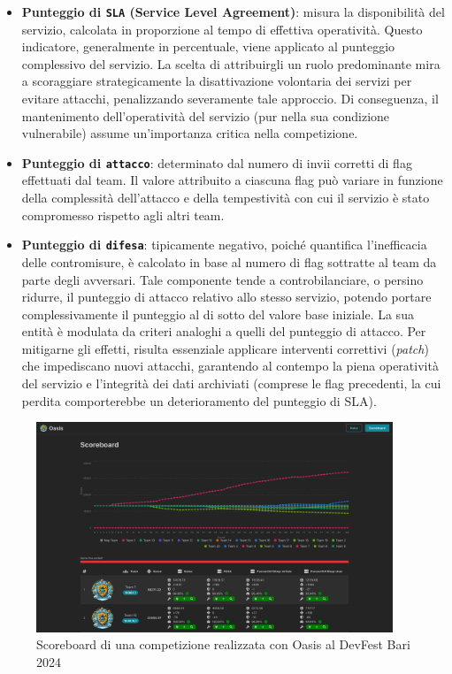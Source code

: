 \begin{itemize}
    \setlength{\itemsep}{2pt}
    \setlength{\parskip}{2pt}
    \item \textbf{Punteggio di \texttt{SLA} (Service Level Agreement)}: misura la disponibilità del servizio, calcolata in proporzione al tempo di effettiva operatività.
    Questo indicatore, generalmente in percentuale, viene applicato al punteggio complessivo del servizio.
    La scelta di attribuirgli un ruolo predominante mira a scoraggiare strategicamente la disattivazione volontaria dei servizi per evitare attacchi, penalizzando severamente tale approccio.
    Di conseguenza, il mantenimento dell’operatività del servizio (pur nella sua condizione vulnerabile) assume un’importanza critica nella competizione.
    \item \textbf{Punteggio di \texttt{attacco}}: determinato dal numero di invii corretti di flag effettuati dal team.
    Il valore attribuito a ciascuna flag può variare in funzione della complessità dell’attacco e della tempestività con cui il servizio è stato compromesso rispetto
    agli altri team.
    \item \textbf{Punteggio di \texttt{difesa}}: tipicamente negativo, poiché quantifica l’inefficacia delle contromisure, è calcolato in base al numero di flag sottratte al
    team da parte degli avversari. Tale componente tende a controbilanciare, o persino ridurre, il punteggio di attacco relativo allo stesso servizio,
    potendo portare complessivamente il punteggio al di sotto del valore base iniziale. La sua entità è modulata da criteri analoghi a quelli del punteggio di attacco.
    Per mitigarne gli effetti, risulta essenziale applicare interventi correttivi (\emph{patch}) che impediscano nuovi attacchi,
    garantendo al contempo la piena operatività del servizio e l’integrità dei dati archiviati (comprese le flag precedenti, la cui perdita comporterebbe un deterioramento del punteggio di SLA).
\end{itemize}

\begin{figure}[H]
    \centering
    \includegraphics[width=0.95\textwidth]{images/chapter1/oasis_scoreboard.png}
    \caption{Scoreboard di una competizione realizzata con Oasis al DevFest Bari 2024}\label{fig:oasis_scoreboard}
\end{figure}

